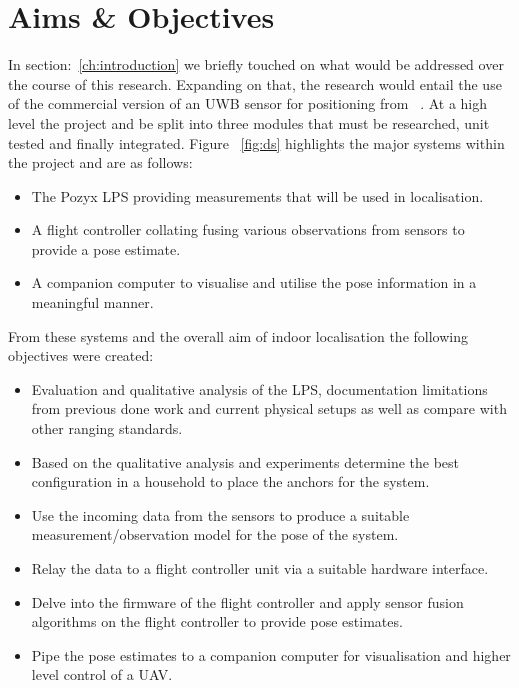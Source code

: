 \chapter{Aims \& Objectives}\label{ch:aims_objs}

In section:~\ref{ch:introduction} we briefly touched on what would be addressed over the course of this research.
Expanding on that, the research would entail the use of the commercial version of an UWB sensor for positioning from ~\textcite{pozyx2018pozyx}.
At a high level the project and be split into three modules that must be researched, unit tested and finally integrated.
Figure ~\ref{fig:ds} highlights the major systems within the project and are as follows:
\begin{itemize}
    \item The Pozyx LPS providing measurements that will be used in localisation.
    \item A flight controller collating fusing various observations from sensors to provide a pose estimate.
    \item A companion computer to visualise and utilise the pose information in a meaningful manner.
\end{itemize}

From these systems and the overall aim of indoor localisation the following objectives were created:
\begin{itemize}
    \item Evaluation and qualitative analysis of the LPS, documentation limitations from previous done work and current physical setups as well as compare with other ranging standards.
    \item Based on the qualitative analysis and experiments determine the best configuration in a household to place the anchors for the system.
    \item Use the incoming data from the sensors to produce a suitable measurement/observation model for the pose of the system.
    \item Relay the data to a flight controller unit via a suitable hardware interface.
    \item Delve into the firmware of the flight controller and apply sensor fusion algorithms on the flight controller to provide pose estimates.
    \item Pipe the pose estimates to a companion computer for visualisation and higher level control of a UAV.
\end{itemize}


